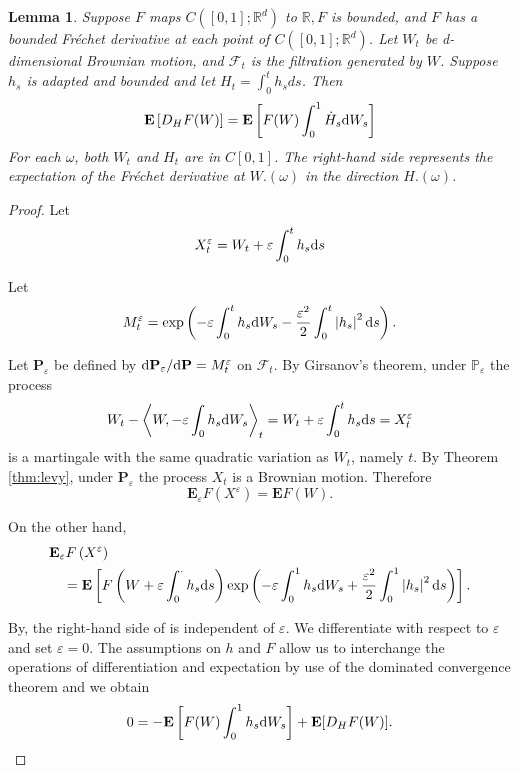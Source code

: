 \documentclass[twoside, 12pt]{book}
\numberwithin{equation}{chapter}
\newtheorem{lemma}[theorem]{Lemma}
\def\cF{{\mathcal F}}
\def\mR{{\mathbb R}}
\def\d{\text{\rm{d}}}
\begin{document}
    \begin{lemma}\label{lem:IBP}
       Suppose $F$ maps $C([0,1];\mR^d)$ to $\mathbb{R}, F$ is bounded, and $F$ has a bounded Fréchet derivative at each point of $C([0,1];\mR^d)$. Let $W_t$ be d-dimensional Brownian motion, and $\cF_t$ is the filtration generated by $W$. Suppose $h_s$ is adapted and bounded and let $H_t=\int_0^t h_s d s$. Then
       \[
           \mathbf{E}\left[D_H F(W)\right]=\mathbf{E}\left[F(W) \int_0^1 \dot{H}_s \d W_s\right]
       \]
       For each $\omega$, both $W_t$ and $H_t$ are in $C[0,1]$. The right-hand side represents the expectation of the Fréchet derivative at $W .(\omega)$ in the direction $H .(\omega)$.
    \end{lemma}
\begin{proof}
    Let
    $$
      X_t^{\varepsilon}=W_t+\varepsilon \int_0^t h_s \d s
    $$

     Let
    $$
         M_t^{\varepsilon}=\exp \left(-\varepsilon \int_0^t h_s \d W_s-\frac{\varepsilon^2}{2} \int_0^t\left|h_s\right|^2 \d s\right) .
    $$

     Let $\mathbf{P}_{\varepsilon}$ be defined by $\d \mathbf{P}_{\varepsilon} / \d \mathbf{P}=M_t^{\varepsilon}$ on $\mathcal{F}_t$. By Girsanov's theorem, under $\mathbb{P}_{\varepsilon}$ the process
    $$
        W_t-\left\langle W,-\varepsilon \int_0 h_s \d W_s\right\rangle_t=W_t+\varepsilon \int_0^t h_s \d s=X_t^{\varepsilon}
    $$
    is a martingale with the same quadratic variation as $W_t$, namely $t$. By Theorem \ref{thm:levy}, under $\mathbf{P}_{\varepsilon}$ the process $X_t$ is a Brownian motion. Therefore
    $$
        \mathbf{E}_{\varepsilon} F\left(X^{\varepsilon}\right)=\mathbf{E} F(W) .
    $$

    On the other hand,
    $$
    \begin{aligned}
    & \mathbf{E}_{\varepsilon} F\left(X^{\varepsilon}\right) \\
    & \quad=\mathbf{E}\left[F\left(W+\varepsilon \int_0^\cdot h_s \d s\right) \exp \left(-\varepsilon \int_0^1 h_s \d W_s+\frac{\varepsilon^2}{2} \int_0^1\left|h_s\right|^2 \d s\right)\right] .
    \end{aligned}
    $$

    By, the right-hand side of  is independent of $\varepsilon$. We differentiate with respect to $\varepsilon$ and set $\varepsilon=0$. The assumptions on $h$ and $F$ allow us to interchange the operations of differentiation and expectation by use of the dominated convergence theorem and we obtain
    \[
    0=-\mathbf{E}\left[F(W) \int_0^1 h_s \d W_s\right]+\mathbf{E} [ D_H F(W) ].
    \]
\end{proof}
\end{document}
